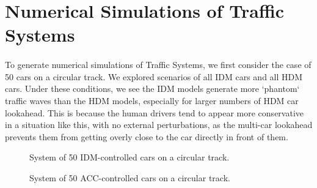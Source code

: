 \documentclass[12pt]{article}
\begin{document}
\section{Numerical Simulations of Traffic Systems}

\paragraph{}To generate numerical simulations of Traffic Systems, we first consider the case of 50 cars on a circular track. We explored scenarios of all IDM cars and all HDM cars. Under these conditions, we see the IDM models generate more `phantom` traffic waves than the HDM models, especially for larger numbers of HDM car lookahead. This is because the human drivers tend to appear more conservative in a situation like this, with no external perturbations, as the multi-car lookahead prevents them from getting overly close to the car directly in front of them.

\begin{figure}[H]
  \centering
  \caption{System of 50 IDM-controlled cars on a circular track.}
\end{figure}

\begin{figure}[H]
  \centering
  \caption{System of 50 ACC-controlled cars on a circular track.}
\end{figure}
\end{document}

